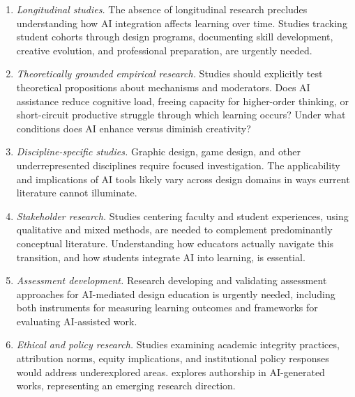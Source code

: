 \documentclass[ed]{acnsart}
\begin{document}
\begin{enumerate}[label={Priority}~\arabic*:,leftmargin=*]
	\item 

\textit{Longitudinal studies.} The absence of longitudinal research precludes understanding how AI integration affects learning over time. Studies tracking student cohorts through design programs, documenting skill development, creative evolution, and professional preparation, are urgently needed.

	\item 

\textit{Theoretically grounded empirical research.} Studies should explicitly test theoretical propositions about mechanisms and moderators. Does AI assistance reduce cognitive load, freeing capacity for higher-order thinking, or short-circuit productive struggle through which learning occurs? Under what conditions does AI enhance versus diminish creativity?

	\item 

\textit{Discipline-specific studies.} Graphic design, game design, and other underrepresented disciplines require focused investigation. The applicability and implications of AI tools likely vary across design domains in ways current literature cannot illuminate.

	\item 

\textit{Stakeholder research.} Studies centering faculty and student experiences, using qualitative and mixed methods, are needed to complement predominantly conceptual literature. Understanding how educators actually navigate this transition, and how students integrate AI into learning, is essential.

	\item 

\textit{Assessment development.} Research developing and validating assessment approaches for AI-mediated design education is urgently needed, including both instruments for measuring learning outcomes and frameworks for evaluating AI-assisted work.

	\item 

\textit{Ethical and policy research.} Studies examining academic integrity practices, attribution norms, equity implications, and institutional policy responses would address underexplored areas. \citet{Mazzi2024} explores authorship in AI-generated works, representing an emerging research direction.
\end{enumerate}
\end{document}
